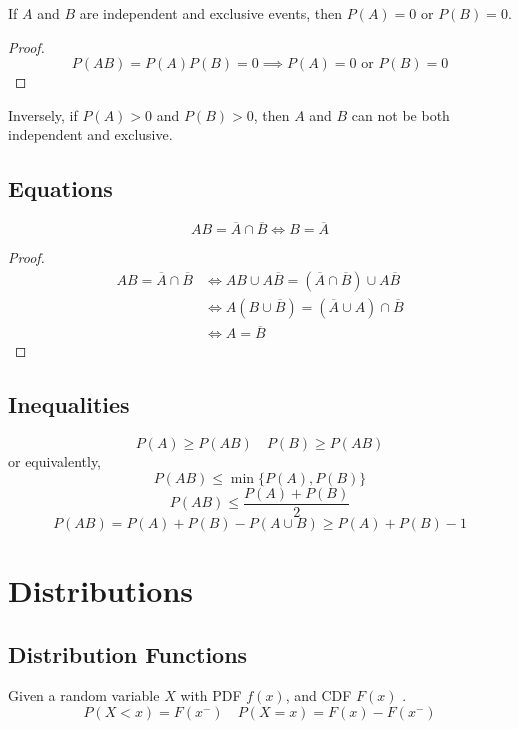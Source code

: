 \documentclass{template}
\begin{document}
\begin{theorem}
	If $A$ and $B$ are independent and exclusive events, then $P(A)=0$ or $P(B)=0$.
	\begin{proof}
		\[
			P(AB)=P(A)P(B)=0 \implies P(A)=0 \text{ or } P(B)=0
		\] 
	\end{proof}
\end{theorem}
\begin{remark}
	Inversely, if $P(A)>0$ and $P(B)>0$, then $A$ and $B$ can not be both independent and exclusive.
\end{remark}


\subsection{Equations}
\begin{theorem}
	\[
		A B = \overline{A} \cap \overline{B} \iff B = \overline{A}
	\] 
	\begin{proof}
		\[
			\begin{aligned}
				A B = \overline{A} \cap \overline{B} 
				&\iff AB \cup A \overline{B} = (\overline{A} \cap \overline{B}) \cup A \overline{B} \\
				&\iff A(B \cup \overline{B}) = (\overline{A} \cup A) \cap \overline{B} \\
				&\iff A = \overline{B}
			\end{aligned}
		\]
	\end{proof}
\end{theorem}

\subsection{Inequalities}

\[
P(A) \geq P(AB) \quad P(B) \geq P(AB)
\] 
or equivalently,
\[
	P(AB) \leq \min\{P(A), P(B)\}
\] 
\[
	P(AB) \leq \frac{P(A) + P(B)}{2}
\] 
\[ P(AB) = P(A) + P(B) - P(A \cup B) \geq P(A) + P(B) - 1 \] 

\section{Distributions}

\subsection{Distribution Functions}

Given a random variable \( X \) with PDF \( f(x) \), and CDF \( F(x) \) .
\[
	P(X<x) = F(x^{-}) \quad P(X=x) = F(x) - F(x^{-})
\] 
\end{document}
